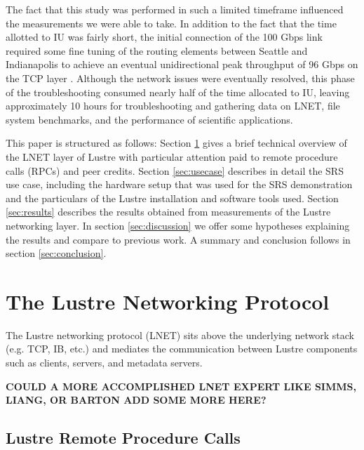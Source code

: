 \documentclass[]{sigplan-proc}
\begin{document}
The fact that this study was performed in such a limited timeframe influenced the measurements we were able to
take. In addition to the fact that the time allotted to IU was fairly short, the initial connection of the 100
Gbps link required some fine tuning of the routing elements between Seattle and Indianapolis to achieve an
eventual unidirectional peak throughput of 96 Gbps on the TCP layer \cite{henschel2012}. Although the network
issues were eventually resolved, this phase of the troubleshooting consumed nearly half of the time allocated
to IU, leaving approximately 10 hours for troubleshooting and gathering data on LNET, file system benchmarks,
and the performance of scientific applications.

This paper is structured as follows: Section \ref{sec:LNET} gives a brief technical overview of the LNET layer
of Lustre with particular attention paid to remote procedure calls (RPCs) and peer credits. Section
\ref{sec:usecase} describes in detail the SRS use case, including the hardware setup that was used for the SRS
demonstration and the particulars of the Lustre installation and software tools used. Section
\ref{sec:results} describes the results obtained from measurements of the Lustre networking layer. In section
\ref{sec:discussion} we offer some hypotheses explaining the results and compare to previous work. A summary and conclusion follows in section \ref{sec:conclusion}.

\section{The Lustre Networking Protocol}\label{sec:LNET}

The Lustre networking protocol (LNET) sits above the underlying network stack (e.g. TCP, IB, etc.) and
mediates the communication between Lustre components such as clients, servers, and metadata servers. 

{\bf COULD A MORE ACCOMPLISHED LNET EXPERT LIKE SIMMS, LIANG, OR BARTON ADD SOME MORE HERE?}

\subsection{Lustre Remote Procedure Calls}
\end{document}
